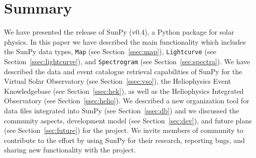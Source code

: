 \section{Summary}
We have presented the release of SunPy (v0.4), a Python package for solar physics. In
this paper we have described the main functionality which includes the SunPy data types, 
\texttt{Map} (see Section~\ref{ssec:map}), \texttt{Lightcurve} (see Section~\ref{ssec:lightcurve}), and \texttt{Spectrogram} (see Section~\ref{sec:spectra}).
We have described the data and event catalogue retrieval capabilities of SunPy for
the Virtual Solar Observatory (see Section~\ref{ssec:vso}), the Heliophysics Event Knowledgebase (see Section~\ref{ssec:hek}), as well as
the Heliophysics Integrated Observatory (see Section~\ref{ssec:helio}). We described
a new organization tool for data files integrated into SunPy (see Section~\ref{ssec:db}) 
and we discussed the community aspects, development model (see Section~\ref{sec:dev}), and future plans (see Section~\ref{sec:future}) for the project.
We invite members of community to contribute to the effort by using SunPy for their 
research, reporting bugs, and sharing new functionality with the project.